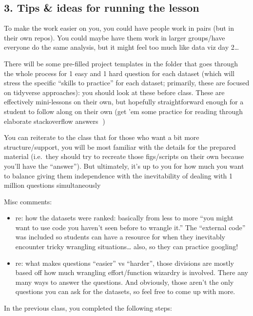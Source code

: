 \documentclass[
  letterpaper,
  DIV=11,
  numbers=noendperiod]{scrreprt}
\begin{document}
\begin{tcolorbox}
\subsection{3. Tips \& ideas for running the lesson}

To make the work easier on you, you could have people work in pairs (but
in their own repos). You could maybe have them work in larger
groups/have everyone do the same analysis, but it might feel too much
like data viz day 2\ldots{}

There will be some pre-filled project templates in the folder that goes
through the whole process for 1 easy and 1 hard question for each
dataset (which will stress the specific ``skills to practice'' for each
dataset; primarily, these are focused on tidyverse approaches): you
should look at these before class. These are effectively mini-lessons on
their own, but hopefully straightforward enough for a student to follow
along on their own (get 'em some practice for reading through elaborate
stackoverflow answers 🥹)

You can reiterate to the class that for those who want a bit more
structure/support, you will be most familiar with the details for the
prepared material (i.e.~they should try to recreate those figs/scripts
on their own because you'll have the ``answer''). But ultimately, it's
up to you for how much you want to balance giving them independence with
the inevitability of dealing with 1 million questions simultaneously 🫡

Misc comments:

\begin{itemize}
\item
  re: how the datasets were ranked: basically from less to more ``you
  might want to use code you haven't seen before to wrangle it.'' The
  ``external code'' was included so students can have a resource for
  when they inevitably encounter tricky wrangling situations\ldots{}
  also, so they can practice googling!
\item
  re: what makes questions ``easier'' vs ``harder'', those divisions are
  mostly based off how much wrangling effort/function wizardry is
  involved. There any many ways to answer the questions. And obviously,
  those aren't the only questions you can ask for the datasets, so feel
  free to come up with more.
\end{itemize}

\end{tcolorbox}

In the previous class, you completed the following steps:
\end{document}
